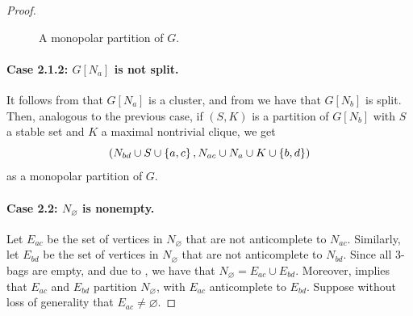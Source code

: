 \begin{proof}
\begin{figure}[htb!]
        \caption{A monopolar partition of $G$.}
        \label{fig:monopolar_partition_c4_case_2_1_1}
    \end{figure}

    \paragraph{Case 2.1.2: $G[N_a]$ is not split.} It follows from
     that $G[N_a]$ is a cluster, and from  we
    have that $G[N_b]$ is split. Then, analogous to the previous case, if
    $(S,K)$ is a partition of $G[N_b]$ with $S$ a stable set and $K$ a maximal
    nontrivial clique, we get
    \[
        \left(N_{bd} \cup S \cup \left\{a,c\right\}, N_{ac} \cup N_a \cup K \cup \left\{b,d\right\}\right)
    \]
    as a monopolar partition of $G$.

    \paragraph{Case 2.2: $N_\varnothing$ is nonempty.} Let $E_{ac}$ be the set
    of vertices in $N_\varnothing$ that are not anticomplete to $N_{ac}$.
    Similarly, let $E_{bd}$ be the set of vertices in $N_\varnothing$ that are
    not anticomplete to $N_{bd}$. Since all 3-bags are empty, and due to
    , we have that $N_\varnothing = E_{ac} \cup E_{bd}$.
    Moreover,  implies that $E_{ac}$ and $E_{bd}$ partition
    $N_{\varnothing}$, with $E_{ac}$ anticomplete to $E_{bd}$. Suppose without
    loss of generality that $E_{ac}\neq \varnothing$.


\end{proof}
